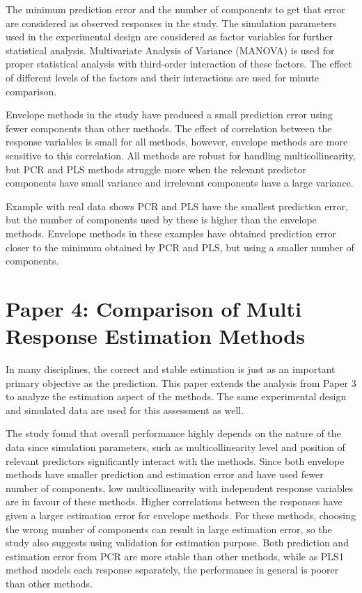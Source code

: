 \documentclass[11pt,twoside,openright,titlepage,
  headinclude,footinclude,BCOR=5mm,
  numbers=noenddot,cleardoublepage=empty,
  tablecaptionabove, dottedtoc,
  bibliography=totoc,paper=a4]{scrreprt}
\begin{document}
The minimum prediction error and the number of components to get that error are considered as observed responses in the study. The simulation parameters used in the experimental design are considered as factor variables for further statistical analysis. Multivariate Analysis of Variance (MANOVA) is used for proper statistical analysis with third-order interaction of these factors. The effect of different levels of the factors and their interactions are used for minute comparison.

Envelope methods in the study have produced a small prediction error using fewer components than other methods. The effect of correlation between the response variables is small for all methods, however, envelope methods are more sensitive to this correlation. All methods are robust for handling multicollinearity, but PCR and PLS methods struggle more when the relevant predictor components have small variance and irrelevant components have a large variance.

Example with real data shows PCR and PLS have the smallest prediction error, but the number of components used by these is higher than the envelope methods. Envelope methods in these examples have obtained prediction error closer to the minimum obtained by PCR and PLS, but using a smaller number of components.

\hypertarget{paper-4-comparison-of-multi-response-estimation-methods}{%
\section{Paper 4: Comparison of Multi Response Estimation Methods}\label{paper-4-comparison-of-multi-response-estimation-methods}}

In many disciplines, the correct and stable estimation is just as an important primary objective as the prediction. This paper extends the analysis from Paper 3 to analyze the estimation aspect of the methods. The same experimental design and simulated data are used for this assessment as well.

The study found that overall performance highly depends on the nature of the data since simulation parameters, such as multicollinearity level and position of relevant predictors significantly interact with the methods. Since both envelope methods have smaller prediction and estimation error and have used fewer number of components, low multicollinearity with independent response variables are in favour of these methods. Higher correlations between the responses have given a larger estimation error for envelope methods. For these methods, choosing the wrong number of components can result in large estimation error, so the study also suggests using validation for estimation purpose. Both prediction and estimation error from PCR are more stable than other methods, while as PLS1 method models each response separately, the performance in general is poorer than other methods.
\end{document}
